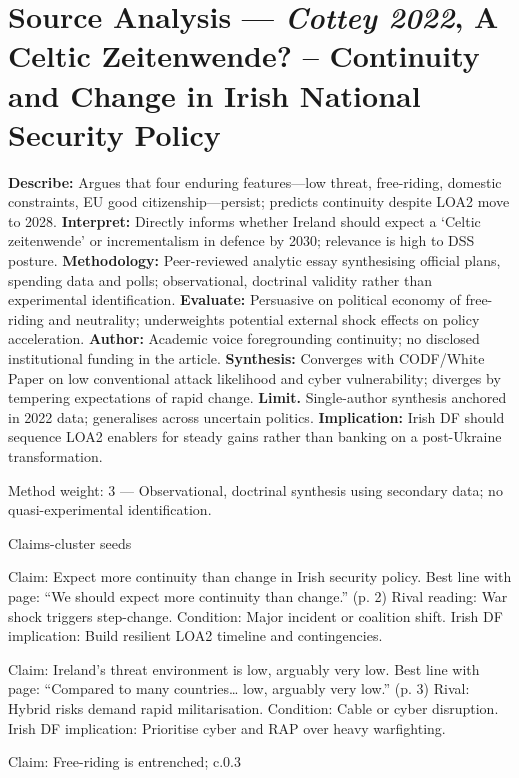 \parencite{COTTEY_2022}

\section*{Source Analysis — \textit{Cottey 2022}, A Celtic Zeitenwende? – Continuity and Change in Irish National Security Policy}
\textbf{Describe:} Argues that four enduring features—low threat, free-riding, domestic constraints, EU good citizenship—persist; predicts continuity despite LOA2 move to 2028.
\textbf{Interpret:} Directly informs whether Ireland should expect a ‘Celtic zeitenwende’ or incrementalism in defence by 2030; relevance is high to DSS posture.
\textbf{Methodology:} Peer-reviewed analytic essay synthesising official plans, spending data and polls; observational, doctrinal validity rather than experimental identification.
\textbf{Evaluate:} Persuasive on political economy of free-riding and neutrality; underweights potential external shock effects on policy acceleration.
\textbf{Author:} Academic voice foregrounding continuity; no disclosed institutional funding in the article.
\textbf{Synthesis:} Converges with CODF/White Paper on low conventional attack likelihood and cyber vulnerability; diverges by tempering expectations of rapid change.
\textbf{Limit.} Single-author synthesis anchored in 2022 data; generalises across uncertain politics.
\textbf{Implication:} Irish DF should sequence LOA2 enablers for steady gains rather than banking on a post-Ukraine transformation.

Method weight: 3 — Observational, doctrinal synthesis using secondary data; no quasi-experimental identification.

Claims-cluster seeds

Claim: Expect more continuity than change in Irish security policy. Best line with page: “We should expect more continuity than change.” (p. 2) Rival reading: War shock triggers step-change. Condition: Major incident or coalition shift. Irish DF implication: Build resilient LOA2 timeline and contingencies.

Claim: Ireland’s threat environment is low, arguably very low. Best line with page: “Compared to many countries… low, arguably very low.” (p. 3) Rival: Hybrid risks demand rapid militarisation. Condition: Cable or cyber disruption. Irish DF implication: Prioritise cyber and RAP over heavy warfighting.

Claim: Free-riding is entrenched; c.0.3%

